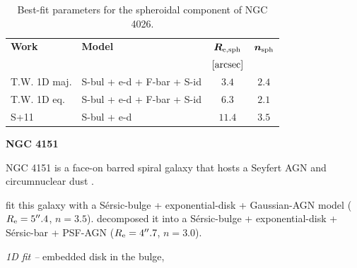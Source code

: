 \documentclass[preprint2]{emulateapj}
\begin{document}
  \begin{table}[h]
  \small
  \caption{Best-fit parameters for the spheroidal component of NGC 4026.}
  \begin{center}
  \begin{tabular}{llcc}
  \hline
  {\bf Work} & {\bf Model}   & $\bm R_{\rm e,sph}$    & $\bm n_{\rm sph}$ \\
    &  &  $[\rm arcsec]$ & \\
  \hline
  T.W. 1D maj. & S-bul + e-d + F-bar + S-id & $3.4$  &  $2.4$ \\
  T.W. 1D eq.  & S-bul + e-d + F-bar + S-id & $6.3$  &  $2.1$ \\
  \hline
  S+11         & S-bul + e-d & $11.4$  &  $3.5$ \\
  \hline
  \end{tabular}
  \end{center}
  \label{tab:n4026}
  \end{table}

  \clearpage\newpage\noindent
  {\bf NGC 4151 \\}

  NGC 4151 is a face-on barred spiral galaxy that hosts a Seyfert AGN \citep{veroncettyveron2006} 
  and circumnuclear dust \citep{pott2010}.

  \cite{sani2011} fit this galaxy with a S\'ersic-bulge + exponential-disk + Gaussian-AGN model
  ($R_{\rm e} = 5''.4$, $n = 3.5$).
  \cite{gadotti2008} decomposed it into a S\'ersic-bulge + exponential-disk + S\'ersic-bar + PSF-AGN 
  ($R_{\rm e} = 4''.7$, $n = 3.0$).

  \emph{1D fit -- }
  embedded disk in the bulge,
\end{document}

